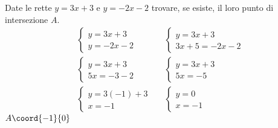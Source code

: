 Date le rette $y=3x+3$ e $y=-2x-2$ trovare, se esiste, il loro punto di intersezione $A$.
\begin{align*}
&\begin{cases}
y=3x+3\\
y=-2x-2
\end{cases}
&&\begin{cases}
y=3x+3\\
3x+5=-2x-2
\end{cases}\\
&\begin{cases}
y=3x+3\\
5x=-3-2
\end{cases}
&&\begin{cases}
y=3x+3\\
5x=-5
\end{cases}\\
&\begin{cases}
y=3(-1)+3\\
x=-1
\end{cases}
&&\begin{cases}
y=0\\
x=-1
\end{cases}
\end{align*}
	$A\coord{-1}{0}$
		\begin{center}
		
		\end{center}
